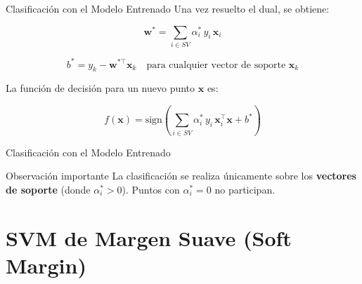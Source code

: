 \documentclass[aspectratio=169,xcolor=dvipsnames]{beamer}
\begin{document}
\begin{frame}{Clasificación con el Modelo Entrenado}
    Una vez resuelto el dual, se obtiene:

    \begin{equation}
        \mathbf{w}^* = \sum_{i \in SV} \alpha_i^* \, y_i \, \mathbf{x}_i
    \end{equation}

    \begin{equation}
        b^* = y_k - \mathbf{w}^{*\top} \mathbf{x}_k \quad \text{para cualquier vector de soporte } \mathbf{x}_k
    \end{equation}

    La función de decisión para un nuevo punto $\mathbf{x}$ es:

    \begin{equation}
        f(\mathbf{x}) = \text{sign}\left( \sum_{i \in SV} \alpha_i^* \, y_i \, \mathbf{x}_i^\top \mathbf{x} + b^* \right)
    \end{equation}
\end{frame}
\begin{frame}{Clasificación con el Modelo Entrenado}

    \begin{alertblock}{Observación importante}
        La clasificación se realiza únicamente sobre los \textbf{vectores de soporte} (donde $\alpha_i^* > 0$). Puntos con $\alpha_i^* = 0$ no participan.
    \end{alertblock}
\end{frame}

\section{SVM de Margen Suave (Soft Margin)}
\end{document}
